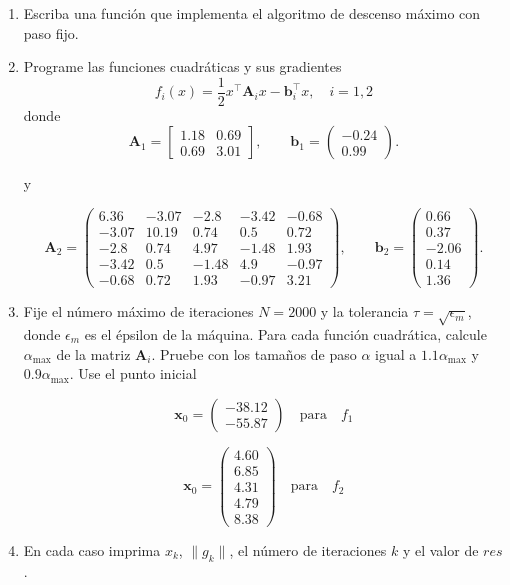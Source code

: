 \documentclass[11pt]{article}
\begin{document}
\begin{enumerate}
\def\labelenumi{\arabic{enumi}.}
\item
  Escriba una función que implementa el algoritmo de descenso máximo con
  paso fijo.
\item
  Programe las funciones cuadráticas y sus gradientes
  \[ f_i(x) = \frac{1}{2} x^\top \mathbf{A}_i x - \mathbf{b}^\top_i x, \quad i=1,2 \]
  donde \[ \mathbf{A}_1 = \left[ \begin{array}{cc}
  1.18 & 0.69 \\
  0.69 & 3.01 
  \end{array} \right],\qquad 
  \mathbf{b}_1 = \left( \begin{array}{r} -0.24 \\ 0.99 \end{array} \right).\]

  y

  \[\mathbf{A}_2=\begin{pmatrix}6.36 & -3.07 & -2.8  & -3.42 & -0.68\\-3.07 & 10.19 &  0.74 &  0.5  & 0.72\\-2.8  & 0.74  &  4.97 & -1.48 & 1.93\\-3.42 & 0.5   & -1.48 &  4.9  & -0.97\\-0.68 & 0.72  &  1.93 & -0.97 & 3.21\end{pmatrix},\qquad\mathbf{b}_2 = \left( \begin{array}{r} 0.66 \\ 0.37  \\ -2.06  \\ 0.14 \\ 1.36 \end{array} \right).\]
\item
  Fije el número máximo de iteraciones \(N=2000\) y la tolerancia
  \(\tau =\sqrt{\epsilon_m}\), donde \(\epsilon_m\) es el épsilon de la
  máquina. Para cada función cuadrática, calcule \(\alpha_{\max}\) de la
  matriz \(\mathbf{A}_i\). Pruebe con los tamaños de paso \(\alpha\)
  igual a \(1.1\alpha_{\max}\) y \(0.9\alpha_{\max}\). Use el punto
  inicial

  \[
  \mathbf{x}_0 = 
  \left( \begin{array}{r} -38.12 \\ -55.87  \end{array} \right) \quad \text{para} \quad f_1
  \]

  \[
  \mathbf{x}_0 = 
  \left( \begin{array}{r} 4.60 \\  6.85 \\  4.31 \\  4.79 \\  8.38  
  \end{array} \right) \quad \text{para} \quad f_2
  \]
\item
  En cada caso imprima \(x_k\), \(\|g_k\|\), el número de iteraciones
  \(k\) y el valor de \(res\).
\end{enumerate}
\end{document}
